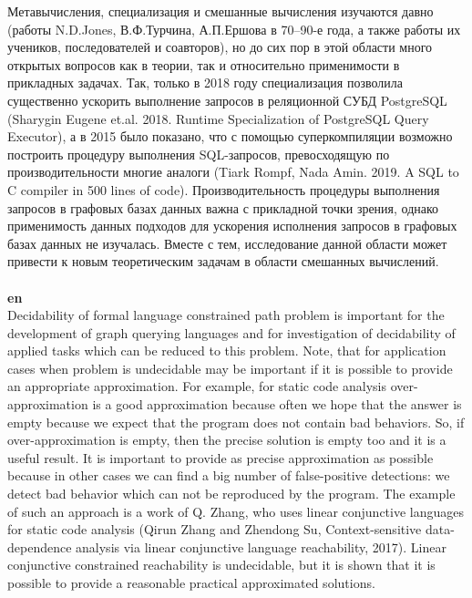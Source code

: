 \documentclass[12pt]{article}  %
\theoremstyle{remark}
\begin{document}
Метавычисления, специализация и смешанные вычисления изучаются давно (работы N.D.Jones, В.Ф.Турчина, А.П.Ершова в 70--90-е года, а также работы их учеников, последователей и соавторов), но до сих пор в этой области много открытых вопросов как в теории, так и относительно применимости в прикладных задачах.
Так, только в 2018 году специализация позволила существенно ускорить выполнение запросов в реляционной СУБД PostgreSQL (Sharygin Eugene et.al. 2018. Runtime Specialization of PostgreSQL Query Executor), а в 2015 было показано, что с помощью суперкомпиляции возможно построить процедуру выполнения SQL-запросов, превосходящую по производительности многие аналоги (Tiark Rompf, Nada Amin. 2019. A SQL to C compiler in 500 lines of code).
Производительность процедуры выполнения запросов в графовых базах данных важна с прикладной точки зрения, однако применимость данных подходов для ускорения исполнения запросов в графовых базах данных не изучалась.
Вместе с тем, исследование данной области может привести к новым теоретическим задачам в области смешанных вычислений.
\\
\\
\textbf{en}\\
Decidability of formal language constrained path problem is important for the development of graph querying languages and for investigation of decidability of applied tasks which can be reduced to this problem.
Note, that for application cases when problem is undecidable may be important if it is possible to provide an appropriate approximation.
For example, for static code analysis over-approximation is a good approximation because often we hope that the answer is empty because we expect that the program does not contain bad behaviors. So, if over-approximation is empty, then the precise solution is empty too and it is a useful result.
It is important to provide as precise approximation as possible because in other cases we can find a big number of false-positive detections: we detect bad behavior which can not be reproduced by the program.
The example of such an approach is a work of Q. Zhang, who uses linear conjunctive languages for static code analysis (Qirun Zhang and Zhendong Su, Context-sensitive data-dependence analysis via linear conjunctive language reachability, 2017). Linear conjunctive constrained reachability is undecidable, but it is shown that it is possible to provide a reasonable practical approximated solutions.
\end{document}
